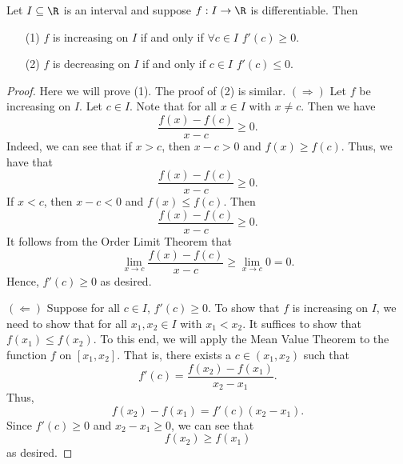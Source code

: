 \begin{theorem}
   Let \( I \subseteq \R   \) is an interval and suppose \( f : I \to \R  \) is differentiable. Then 
   \begin{enumerate}
       \item[(1)] \( f  \) is increasing on \( I  \) if and only if \( \forall c \in I  \) \( f'(c) \geq 0  \).
        \item[(2)] \( f  \) is decreasing on \( I  \) if and only if \( c \in I   \) \( f'(c) \leq 0  \).
   \end{enumerate}
\end{theorem}
\begin{proof}
Here we will prove (1). The proof of (2) is similar. 
\( (\Longrightarrow) \) Let \( f  \) be increasing on \( I  \). Let \( c \in I  \). Note that for all \( x \in I  \) with \( x \neq c  \). Then we have 
\[  \frac{ f(x) - f(c) }{ x - c  }  \geq 0.  \]
Indeed, we can see that if \( x > c  \), then \( x - c > 0  \) and \( f(x) \geq f(c) \). Thus, we have that 
\[  \frac{ f(x) - f(c) }{ x - c  }  \geq 0.  \]
If \( x < c  \), then \( x - c < 0  \) and \( f(x) \leq f(c) \). Then 
\[  \frac{ f(x) - f(c) }{ x -c  }  \geq 0. \]
It follows from the Order Limit Theorem that 
\[  \lim_{ x \to c  }  \frac{ f(x) - f(c) }{  x-  c  }  \geq \lim_{ x \to c  }  0  = 0. \]
Hence, \( f'(c) \geq 0 \) as desired.

\( (\Longleftarrow) \) Suppose for all \( c \in I  \), \( f'(c) \geq 0  \). To show that \( f  \) is increasing on \( I  \), we need to show that for all \( {x}_{1}, {x}_{2} \in I   \) with \( {x}_{1} < {x}_{2} \). It suffices to show that \( f({x}_{1}) \leq f({x}_{2}) \). To this end, we will apply the Mean Value Theorem to the function \( f  \) on \( [{x}_{1}, {x}_{2}] \). That is, there exists a \( c \in ({x}_{1}, {x}_{2}) \) such that 
\[  f'(c) = \frac{ f({x}_{2})- f({x}_{1}) }{  {x}_{2} - {x}_{1} }. \]
Thus, 
\[  f({x}_{2}) - f({x}_{1}) = f'(c) ({x}_{2} - {x}_{1}). \]
Since \( f'(c) \geq 0  \) and \( {x}_{2} - {x}_{1} \geq 0  \), we can see that 
\[  f({x}_{2}) \geq f({x}_{1}) \]
as desired.
\end{proof}

